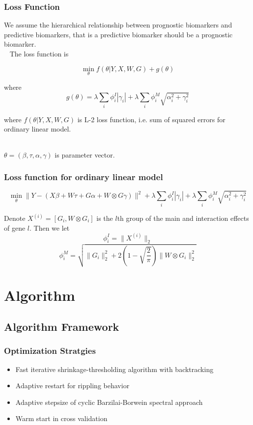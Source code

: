 \documentclass{beamer}
\begin{document}
    \begin{frame}
    \frametitle{Loss Function}
    
    We assume the hierarchical relationship between prognostic biomarkers and predictive biomarkers, 
    that is a predictive biomarker should be a prognostic biomarker.\\~
    The loss function is
    
    $$\min_{\theta} f(\theta|Y,X,W,G)+ g(\theta)$$
    
     where $$ g(\theta)=\lambda \sum_i \phi_i^I |\gamma_i| + \lambda \sum_i \phi_i^M \sqrt{\alpha_i^2 + \gamma_i^2}$$
    
    where $f(\theta|Y,X,W,G)$ is L-2 loss function, i.e. sum of squared errors for ordinary linear model.\\~
    
    $\theta=(\beta, \tau, \alpha, \gamma)$ is parameter vector.
    
    
    
    \end{frame}
    
    \begin{frame}
    \frametitle{Loss function for ordinary linear model}
    
    $$\min_{\theta} \parallel Y-(X\beta + W\tau + G\alpha + W\otimes G \gamma) \parallel^2 + \lambda \sum_i \phi_i^I |\gamma_i| + \lambda \sum_i \phi_i^M \sqrt{\alpha_i^2 + \gamma_i^2}$$
    
    Denote $X^{(i)}=[G_i,W\otimes G_i]$ is the $l$th group of the main and interaction effects of gene $l$.
    Then we let $$\phi_i^I=\parallel X^{(i)}\parallel_2$$ $$\phi_i^M=\sqrt{\parallel G_i\parallel_2^2+2(1-\sqrt{\frac{2}{\pi}})\parallel W\otimes G_i\parallel_2^2 }$$
    \end{frame}
    
    
    \section{Algorithm}
    
    \subsection{Algorithm Framework}
    
    \begin{frame}
    \frametitle{Optimization Stratgies}
    \begin{itemize}
    \item Fast iterative shrinkage-thresholding algorithm with backtracking\cite{fasta}
    \item Adaptive restart for rippling behavior \cite{restart}
    \item Adaptive stepsize of cyclic Barzilai-Borwein spectral approach\cite{step}
    \item Warm start in cross validation
    \end{itemize}
    
    \end{frame}
    
\end{document}

